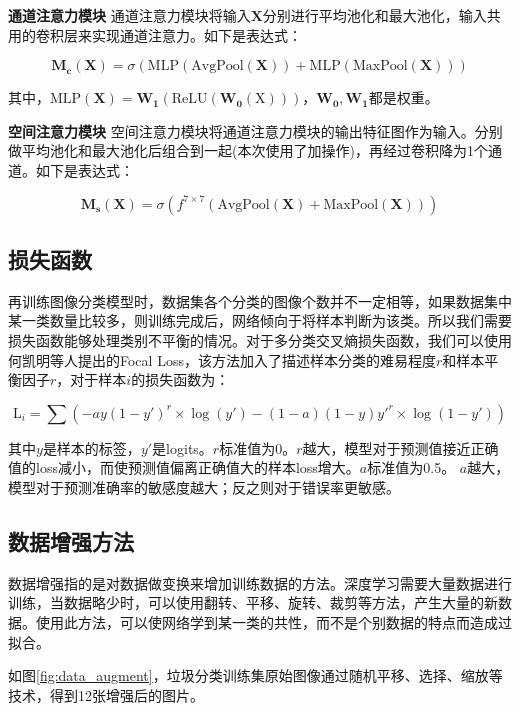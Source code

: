 \documentclass[a4paper]{article}
\begin{document}
\begin{CJK*}{UTF8}{gbsn}
\textbf{通道注意力模块} 通道注意力模块将输入$\mathbf{X}$分别进行平均池化和最大池化，输入共用的卷积层来实现通道注意力。如下是表达式：

$$\mathbf{M_c}(\mathbf{X})=\sigma(\mathrm{MLP}(\mathrm{AvgPool}(\mathbf{X}))+\mathrm{MLP}(\mathrm{MaxPool(\mathbf{X})}))$$

其中，$\mathrm{MLP}(\mathbf{X})=\mathbf{W_1}(\mathrm{ReLU}(\mathbf{W_0}(\mathrm{X})))$，$\mathbf{W_0},\mathbf{W_1}$都是权重。

\textbf{空间注意力模块} 空间注意力模块将通道注意力模块的输出特征图作为输入。分别做平均池化和最大池化后组合到一起(本次使用了加操作)，再经过卷积降为1个通道。如下是表达式：

$$\mathbf{M_s}(\mathbf{X})=\sigma(\mathit{}{f}^{7\times 7}(\mathrm{AvgPool}(\mathbf{X})+\mathrm{MaxPool}(\mathbf{X})))$$

\subsection{损失函数}

再训练图像分类模型时，数据集各个分类的图像个数并不一定相等，如果数据集中某一类数量比较多，则训练完成后，网络倾向于将样本判断为该类。所以我们需要损失函数能够处理类别不平衡的情况。对于多分类交叉熵损失函数，我们可以使用何凯明等人提出的Focal Loss\cite{lin2017focal}，该方法加入了描述样本分类的难易程度$r$和样本平衡因子$r$，对于样本$i$的损失函数为：

$$\mathrm{L}_i=\sum(-ay(1-y')^r\times\log(y')-(1-a)(1-y)y'^r\times\log(1-y'))$$

其中$y$是样本的标签，$y'$是logits。$r$标准值为0。$r$越大，模型对于预测值接近正确值的loss减小，而使预测值偏离正确值大的样本loss增大。$a$标准值为0.5。 $a$越大，模型对于预测准确率的敏感度越大；反之则对于错误率更敏感。

\subsection{数据增强方法}

数据增强指的是对数据做变换来增加训练数据的方法。深度学习需要大量数据进行训练，当数据略少时，可以使用翻转、平移、旋转、裁剪等方法，产生大量的新数据。使用此方法，可以使网络学到某一类的共性，而不是个别数据的特点而造成过拟合。

如图\ref{fig:data_augment}，垃圾分类训练集原始图像通过随机平移、选择、缩放等技术，得到12张增强后的图片。


\end{CJK*}
\end{document}
